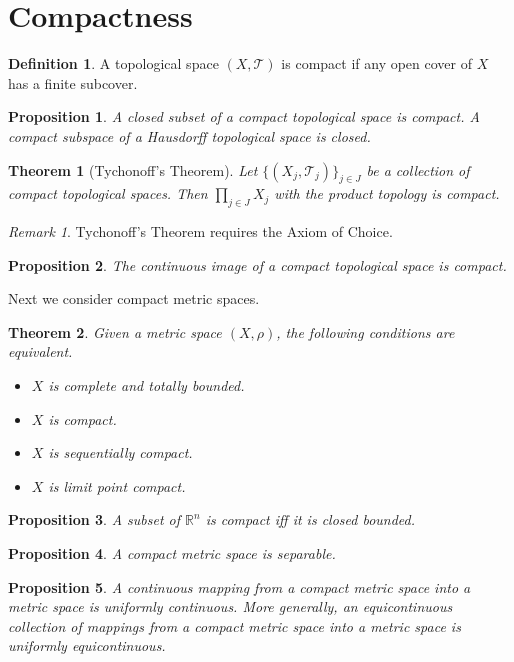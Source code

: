 \documentclass[openany]{book}
\newtheorem{proposition}{Proposition}[chapter]
\newtheorem{theorem}{Theorem}[chapter]
\theoremstyle{definition}
\newtheorem{definition}{Definition}[chapter]
\theoremstyle{remark}
\newtheorem*{remark}{Remark}
\begin{document}
\section{Compactness}
\begin{definition}
    A topological space $(X,\mathcal{T})$ is compact if any open cover of $X$ has a finite subcover.
\end{definition}
\begin{proposition}
    A closed subset of a compact topological space is compact. A compact subspace of a Hausdorff topological space is closed.
\end{proposition}
\begin{theorem}[Tychonoff's Theorem]
    Let $\{(X_j,\mathcal{T}_j)\}_{j\in J}$ be a collection of compact topological spaces. Then $\prod_{j\in J}X_j$ with the product topology is compact.
\end{theorem}
\begin{remark}
    Tychonoff's Theorem requires the Axiom of Choice.
\end{remark}
\begin{proposition}
    The continuous image of a compact topological space is compact.
\end{proposition}

Next we consider compact metric spaces.
\begin{theorem}
    Given a metric space $(X,\rho)$, the following conditions are equivalent.
    \begin{itemize}
        \item $X$ is complete and totally bounded.
        \item $X$ is compact.
        \item $X$ is sequentially compact.
        \item $X$ is limit point compact.
    \end{itemize}
\end{theorem}
\begin{proposition}
    A subset of $\mathbb{R}^n$ is compact iff it is closed bounded.
\end{proposition}
\begin{proposition}
    A compact metric space is separable.
\end{proposition}
\begin{proposition}
    A continuous mapping from a compact metric space into a metric space is uniformly continuous. More generally, an equicontinuous collection of mappings from a compact metric space into a metric space is uniformly equicontinuous.
\end{proposition}
\end{document}
